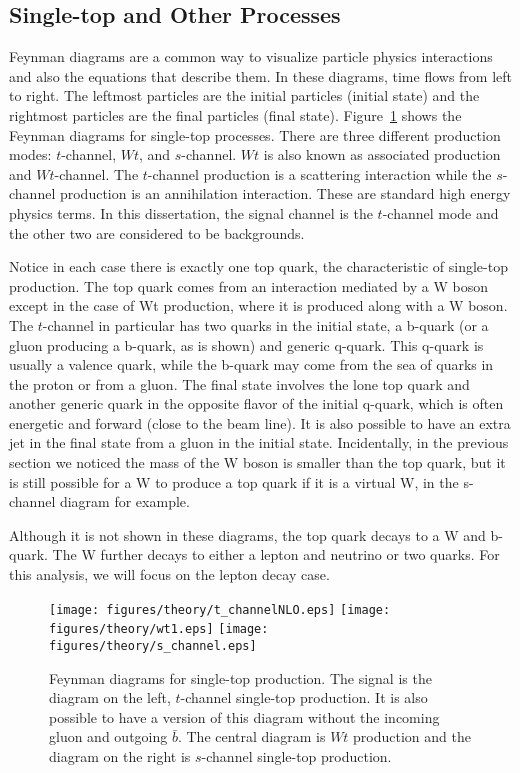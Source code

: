\subsection{Single-top and Other Processes}
 \label{sec:Feynman}
Feynman diagrams are a common way to visualize particle physics interactions and also the equations that describe them.  In these diagrams, time flows from left to right.  The leftmost particles are the initial particles (initial state) and the rightmost particles are the final particles (final state).  Figure~\ref{fig:Feynman_singletop} shows the Feynman diagrams for single-top processes.  There are three different production modes: $t$-channel, $Wt$, and $s$-channel.  $Wt$ is also known as associated production and $Wt$-channel.  The $t$-channel production is a scattering interaction while the $s$-channel production is an annihilation interaction.  These are standard high energy physics terms.  In this dissertation, the signal channel is the $t$-channel mode and the other two are considered to be backgrounds.  

Notice in each case there is exactly one top quark, the characteristic of single-top production.  The top quark comes from an interaction mediated by a W boson except in the case of Wt production, where it is produced along with a W boson.  The $t$-channel in particular has two quarks in the initial state, a b-quark (or a gluon producing a b-quark, as is shown) and generic q-quark.  This q-quark is usually a valence quark, while the b-quark may come from the sea of quarks in the proton or from a gluon.  The final state involves the lone top quark and another generic quark in the opposite flavor of the initial q-quark, which is often energetic and forward (close to the beam line).  It is also possible to have an extra jet in the final state from a gluon in the initial state.  Incidentally, in the previous section we noticed the mass of the W boson is smaller than the top quark, but it is still possible for a W to produce a top quark if it is a virtual W, in the s-channel diagram for example.

Although it is not shown in these diagrams, the top quark decays to a W and b-quark.  The W further decays to either a lepton and neutrino or two quarks.  For this analysis, we will focus on the lepton decay case.%
 
\begin{figure}[!h!tpb]
 \centering
 \texttt{[image: figures/theory/t\_channelNLO.eps]}
 \texttt{[image: figures/theory/wt1.eps]}
 \texttt{[image: figures/theory/s\_channel.eps]}
 \caption{Feynman diagrams for single-top production.  The signal is the diagram on the left, $t$-channel single-top production.  It is also possible to have a version of this diagram without the incoming gluon and outgoing $\bar{b}$.  The central diagram is $Wt$ production and the diagram on the right is $s$-channel single-top production.}
 \label{fig:Feynman_singletop}
 \end{figure}

